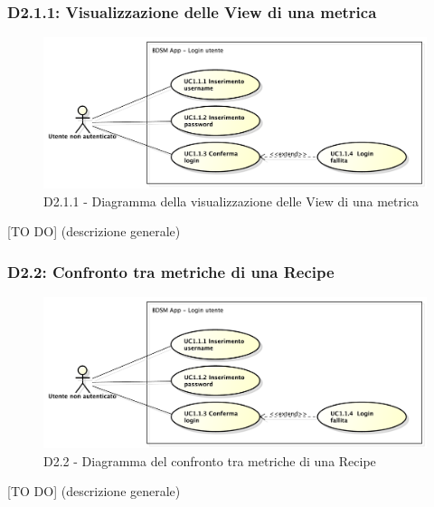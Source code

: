 		\subsubsection{D2.1.1: Visualizzazione delle View di una metrica} %
		\label{ssub:visualizzazione_view_di_una_metrica}
		\begin{figure}[!htbp]
			\centering
			\centerline{\includegraphics[scale=0.45]{./images/UC1_1.pdf}}
			\caption{D2.1.1 - Diagramma della visualizzazione delle View di una metrica}
		\end{figure}
		[TO DO] (descrizione generale)

		\subsubsection{D2.2: Confronto tra metriche di una Recipe} %
		\label{ssub:confronto_tra_metriche_di_una_recipe}
		\begin{figure}[!htbp]
			\centering
			\centerline{\includegraphics[scale=0.45]{./images/UC1_1.pdf}}
			\caption{D2.2 - Diagramma del confronto tra metriche di una Recipe}
		\end{figure}
		[TO DO] (descrizione generale)

